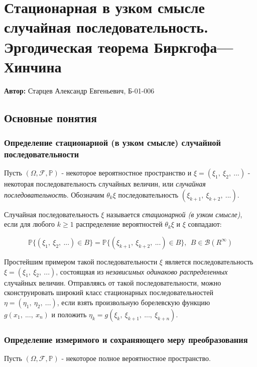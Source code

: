 
\section{Стационарная в узком смысле случайная последовательность. Эргодическая теорема Биркгофа—Хинчина}

\textbf{Автор:} Старцев Александр Евгеньевич, Б-01-006

\subsection{Основные понятия}
\subsubsection{Определение стационарной (в узком смысле) случайной последовательности}
\label{sec:def}

Пусть $(\Omega, \mathscr{F}, \mathbb{P})$ - некоторое вероятностное пространство и $\xi = (\xi_1, ~\xi_2, ~...)$ - некоторая последовательность случайных величин, или \textit{случайная последовательность}. Обозначим $\theta_k\xi$ последовательность $(\xi_{k+1}, ~\xi_{k+2}, ~...)$.

\begin{definition} Случайная последовательность $\xi$ называется \textit{стационарной (в узком смысле)}, если для любого $k \geq 1$ распределение вероятностей $\theta_k\xi$ и $\xi$ совпадают:

{\centering 
\begin{equation}
\mathbb{P}\{(\xi_1, ~\xi_2, ~...) \in B\} = \mathbb{P}\{(\xi_{k+1}, ~\xi_{k+2}, ~...) \in B\}, ~~B \in \mathscr{B}(R^{\infty})
\end{equation}
}
\end{definition}

Простейшим примером такой последовательности $\xi$ является последовательность $\xi = (\xi_1, ~\xi_2, ~...)$, состоящяая из \textit{независимых одинаково распределенных} случайных величин. Отправляясь от такой последовательности, можно сконструировать широкий класс стационарных последовательностей $\eta = (\eta_1, ~\eta_2, ~...)$, если взять произвольную борелевскую функцию $g(x_1, ~..., ~x_n)$ и положить $\eta_k = g(\xi_k, ~\xi_{k+1}, ~..., ~\xi_{k+n})$.

\subsubsection{Определение измеримого и сохраняющего меру преобразования}
Пусть $(\Omega, \mathscr{F}, \mathbb{P})$ - некоторое полное вероятностное пространство.

